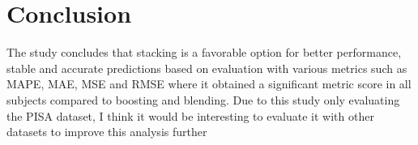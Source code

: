 \documentclass[final,5p,times,twocolumn,authoryear]{elsarticle}
\begin{document}
\section{Conclusion}
The study \cite{Stacking} concludes that stacking is a favorable option for better performance, stable and accurate predictions based on evaluation with various metrics such as MAPE, MAE, MSE and RMSE where it obtained a significant metric score in all subjects compared to boosting and blending.
Due to this study only evaluating the PISA dataset, I think it would be interesting to evaluate it with other datasets to improve this analysis further










\end{document}
